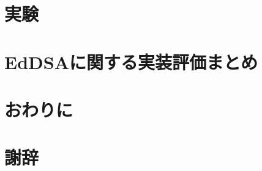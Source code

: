 \documentclass[
  luatex,
  paper=a4paper,
  fontsize=11pt,
  report,
  jlreq_notes,
]{jlreq}
\begin{document}
\chapter[　　 実験]{実験}

\chapter[　　 EdDSAに関する実装評価まとめ]{EdDSAに関する実装評価まとめ}

\chapter*{おわりに}

\chapter*{謝辞}
% 


\end{document}

